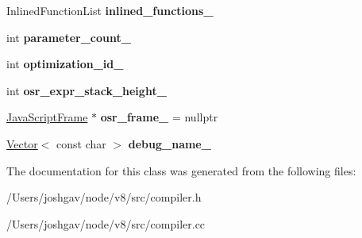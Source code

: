 \begin{DoxyCompactItemize}
\item 
Inlined\+Function\+List {\bfseries inlined\+\_\+functions\+\_\+}\hypertarget{classv8_1_1internal_1_1_compilation_info_ac13af5ece1c94a2ec97b7e07bb732490}{}\label{classv8_1_1internal_1_1_compilation_info_ac13af5ece1c94a2ec97b7e07bb732490}

\item 
int {\bfseries parameter\+\_\+count\+\_\+}\hypertarget{classv8_1_1internal_1_1_compilation_info_aa1c46605d1f1e44f0ffc3a0ed241c36c}{}\label{classv8_1_1internal_1_1_compilation_info_aa1c46605d1f1e44f0ffc3a0ed241c36c}

\item 
int {\bfseries optimization\+\_\+id\+\_\+}\hypertarget{classv8_1_1internal_1_1_compilation_info_a61cc47a785172c57fc14e24d4151f8b9}{}\label{classv8_1_1internal_1_1_compilation_info_a61cc47a785172c57fc14e24d4151f8b9}

\item 
int {\bfseries osr\+\_\+expr\+\_\+stack\+\_\+height\+\_\+}\hypertarget{classv8_1_1internal_1_1_compilation_info_a40b656b8322f5c7f1899fb1184b143b1}{}\label{classv8_1_1internal_1_1_compilation_info_a40b656b8322f5c7f1899fb1184b143b1}

\item 
\hyperlink{classv8_1_1internal_1_1_java_script_frame}{Java\+Script\+Frame} $\ast$ {\bfseries osr\+\_\+frame\+\_\+} = nullptr\hypertarget{classv8_1_1internal_1_1_compilation_info_a14adc230606664a25a83853e1651108c}{}\label{classv8_1_1internal_1_1_compilation_info_a14adc230606664a25a83853e1651108c}

\item 
\hyperlink{classv8_1_1internal_1_1_vector}{Vector}$<$ const char $>$ {\bfseries debug\+\_\+name\+\_\+}\hypertarget{classv8_1_1internal_1_1_compilation_info_a21ce2d5d04bce1401b1faac5ef43c956}{}\label{classv8_1_1internal_1_1_compilation_info_a21ce2d5d04bce1401b1faac5ef43c956}

\end{DoxyCompactItemize}


The documentation for this class was generated from the following files\+:\begin{DoxyCompactItemize}
\item 
/\+Users/joshgav/node/v8/src/compiler.\+h\item 
/\+Users/joshgav/node/v8/src/compiler.\+cc\end{DoxyCompactItemize}
